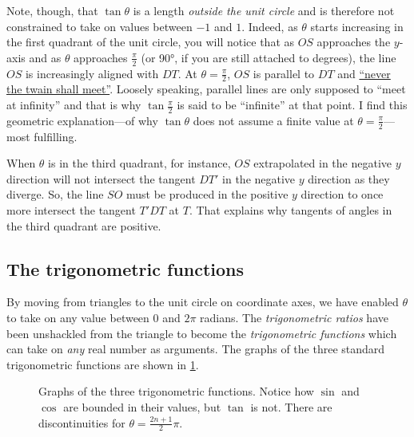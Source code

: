 \documentclass[
  a4paper,
]{article}
\begin{document}
Note, though, that \(\tan\theta\) is a length \emph{outside the unit
circle} and is therefore not constrained to take on values between
\(-1\) and \(1\). Indeed, as \(\theta\) starts increasing in the first
quadrant of the unit circle, you will notice that as \(OS\) approaches
the \(y\)-axis and as \(\theta\) approaches \(\frac{\pi}{2}\) (or 90°,
if you are still attached to degrees), the line \(OS\) is increasingly
aligned with \(DT\). At \(\theta=\frac{\pi}{2}\), \(OS\) is parallel to
\(DT\) and
\href{https://en.wikipedia.org/wiki/The_Ballad_of_East_and_West}{``never
the twain shall meet''}. Loosely speaking, parallel lines are only
supposed to ``meet at infinity'' and that is why \(\tan\frac{\pi}{2}\)
is said to be ``infinite'' at that point. I find this geometric
explanation---of why \(\tan\theta\) does not assume a finite value at
\(\theta=\frac{\pi}{2}\)---most fulfilling.

When \(\theta\) is in the third quadrant, for instance, \(OS\)
extrapolated in the negative \(y\) direction will not intersect the
tangent \(DT'\) in the negative \(y\) direction as they diverge. So, the
line \(SO\) must be produced in the positive \(y\) direction to once
more intersect the tangent \(T'DT\) at \(T\). That explains why tangents
of angles in the third quadrant are positive.

\hypertarget{the-trigonometric-functions}{%
\subsection{The trigonometric
functions}\label{the-trigonometric-functions}}

By moving from triangles to the unit circle on coordinate axes, we have
enabled \(\theta\) to take on any value between 0 and \(2\pi\) radians.
The \emph{trigonometric ratios} have been unshackled from the triangle
to become the \emph{trigonometric functions} which can take on
\emph{any} real number as arguments. The graphs of the three standard
trigonometric functions are shown in \cref{fig:threegraph}.

\begin{figure}
\hypertarget{fig:threegraph}{%
\centering

\caption{Graphs of the three trigonometric functions. Notice how
\(\sin\) and \(\cos\) are bounded in their values, but \(\tan\) is not.
There are discontinuities for
\(\theta=\frac{2n+1}{2}\pi\).}\label{fig:threegraph}
}
\end{figure}
\end{document}
